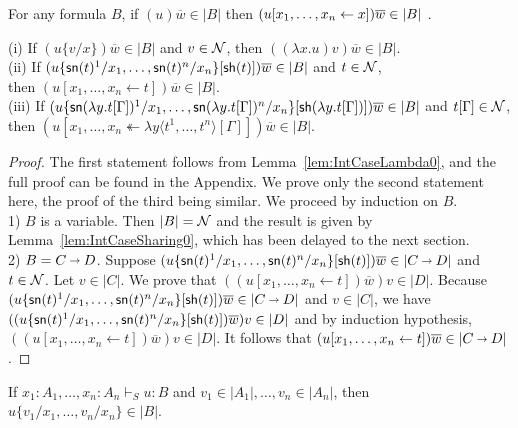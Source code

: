 \documentclass{llncs} %
\begin{document}
\begin{lemma}\label{lem:Red-AddSharings}
For any formula $B$,  if $(u)\overline{w}\in |B|$ then $(u\share xx)\overline{w} \in |B|$ .
\end{lemma}

\begin{lemma}\label{lem:IntCaseLambdaSharing} $\;$ \\
(i) If $(u\{v/x\})\overline{w} \in |B|$ and $v\in\mathcal{N}$, then $((\lambda x.u) v)\overline{w} \in |B|$.
\\
(ii) If $(u\{{\mathsf{sn}}(t)^1/x_1,\dots,{\mathsf{sn}}(t)^n/x_n\}[{\mathsf{sh}} (t)])\overline{w} \in |B|$ and $t\in\mathcal{N}$, \\ then  $(u[x_1,\dots,x_n \leftarrow t])\overline{w} \in |B|$.
\\
(iii) If $(u\{{\mathsf{sn}}(\lambda y.t[\Gamma])^1/x_1,\dots,{\mathsf{sn}}(\lambda y.t[\Gamma])^n/x_n\}[{\mathsf{sh}} (\lambda y.t[\Gamma])])\overline{w} \in |B|$ and $t[\Gamma]\in\mathcal{N}$, \\ then  $(u[x_1,\dots,x_n \twoheadleftarrow \lambda y\langle t^1,\dots,t^n \rangle[\Gamma]])\overline{w} \in |B|$.
\end{lemma}

\begin{proof}
The first statement follows from Lemma~\ref{lem:IntCaseLambda0}, and the full proof can be found in the Appendix.
We prove only the second statement here, the proof of the third being similar.
We proceed by induction on $B$.
\\
1) $B$ is a variable. Then $|B| = \mathcal{N}$ and the result is given by Lemma~\ref{lem:IntCaseSharing0}, which has been delayed to the next section.
\\
2) $B= C\vlim D$.
Suppose $(u\{\sn(t)^1/x_1,\dots,\sn(t)^n/x_n\}[\sh (t)])\overline{w} \in |C\vlim D|$ and $t\in\mathcal{N}$. Let $v\in|C|$. We prove that  $((u[x_1,\dots,x_n \leftarrow t])\overline{w})v \in |D|$. Because $(u\{\sn(t)^1/x_1,\dots,\sn(t)^n/x_n\}[\sh (t)])\overline{w} \in |C\vlim D|$ and $v\in|C|$, we have $((u\{{\mathsf{sn}}(t)^1/x_1,\dots,{\mathsf{sn}}(t)^n/x_n\}[{\mathsf{sh}} (t)])\overline{w})v \in |D|$ and by induction hypothesis, $((u[x_1,\dots,x_n \leftarrow t])\overline{w})v \in |D|$. It follows that $(u[x_1,\dots,x_n \leftarrow t])\overline{w} \in |C\vlim D|$.

\end{proof}

\begin{proposition}\label{prop:IntSubst}
If $x_1:A_1,\ldots, x_n:A_n \vdash_S u:B$ and $v_1 \in |A_1|, \dots, v_n \in |A_n|$, then $u\{v_1/x_1, \dots, v_n/x_n\} \in |B|$.
\end{proposition}
\end{document}
